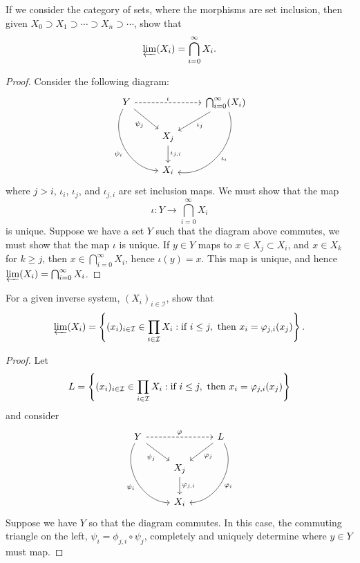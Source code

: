 \documentclass{ximera}
\begin{document}
\begin{example}
  If we consider the category of sets, where the morphisms are set
  inclusion, then given $X_0\supset X_1\supset \cdots \supset
  X_n\supset \cdots$, show that
  \[
  \varprojlim(X_i) = \bigcap_{i=0}^\infty X_i.
  \]
  \begin{proof}
    Consider the following diagram:
    \[
    \begin{tikzcd}
      Y\ar[ddr,bend right=60,swap,"\psi_i"] \ar[dr,swap,"\psi_j"]  \ar[dashed,rr,"\iota"] &   &  \bigcap_{i=0}^\infty(X_{i}) \ar[ddl,bend left=60,"\iota_i"] \ar[dl,"\iota_j"]\\
      & X_{j} \ar[d,"\iota_{j,i}"] &\\
      & X_{i}&
    \end{tikzcd}
    \]
    where $j>i$, $\iota_i$, $\iota_j$, and $\iota_{j,i}$ are set
    inclusion maps.  We must show that the map
    \[
    \iota: Y \to \bigcap_{i=0}^\infty X_i
    \]
    is unique.  Suppose we have a set $Y$ such that the diagram above
    commutes, we must show that the map $\iota$ is unique.  If $y\in
    Y$ maps to $x\in X_j\subset X_i$, and $x\in X_k$ for $k\ge j$,
    then $x\in\bigcap_{i=0}^\infty X_i$, hence $\iota(y) = x$. This
    map is unique, and hence $\varprojlim(X_i) = \bigcap_{i=0}^\infty
    X_i$.
  \end{proof}
\end{example}



\begin{example}
  For a given inverse system, $(X_i)_{i\in \mathcal{I}}$,
  show that
  \[
  \varprojlim(X_i) = \left\{(x_i)_{i\in \mathcal{I}}\in
  \prod_{i\in \mathcal{I}} X_i:\text{if }i\le j,\text{ then }x_i =
  \varphi_{j,i}(x_j) \right\}.
  \]
  \begin{proof}
    Let
    \[
    L =
    \left\{(x_i)_{i\in \mathcal{I}}\in \prod_{i\in \mathcal{I}} X_i:\text{if }i\le j,\text{ then }x_i = \varphi_{j,i}(x_j) \right\}
    \]
    and consider
    \[
    \begin{tikzcd}
      Y\ar[ddr,bend right=60,swap,"\psi_i"] \ar[dr,swap,"\psi_j"]  \ar[dashed,rr,"\ph"] &   &  L \ar[ddl,bend left=60,"\ph_i"] \ar[dl,"\ph_j"]\\
      & X_{j} \ar[d,"\ph_{j,i}"] &\\
      & X_{i}&
    \end{tikzcd}
    \]
    Suppose we have $Y$ so that the diagram commutes. In this case,
    the commuting triangle on the left, $\psi_i =
    \phi_{j,i}\circ\psi_j$, completely and uniquely determine where
    $y\in Y$ must map.
  \end{proof}
\end{example}
\end{document}

